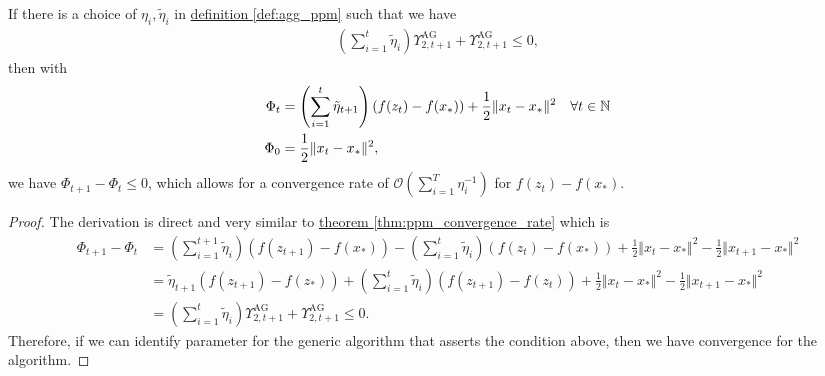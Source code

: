 \documentclass[12pt]{article}
\begin{document}
        \begin{theorem}\label{thm:generic_smooth_ag_convergence}
            If there is a choice of $\eta_i, \tilde \eta_i$ in \hyperref[def:agg_ppm]{definition \ref*{def:agg_ppm}} such that we have 
            \begin{align*}
                \left(
                    \sum_{i = 1}^{t} \tilde \eta_i
                \right)\Upsilon_{2, t + 1}^{\text{AG}} + \Upsilon_{2, t + 1}^{\text{AG}} \le 0, 
            \end{align*}
            then with 
            \begin{align*}
                \Phi_t &= \left(
                    \sum_{i = 1}^{t} \tilde\eta_{t + 1}
                \right) (f(z_t) - f(x_*)) + \frac{1}{2}\Vert x_t - x_*\Vert^2 \quad \forall t \in \mathbb N
                \\
                \Phi_0 &= \frac{1}{2}\Vert x_t - x_*\Vert^2, 
            \end{align*}
            we have $\Phi_{t + 1} - \Phi_t \le 0$, which allows for a convergence rate of $\mathcal O \left(\sum_{i = 1}^{T} \eta_i^{-1}\right)$ for $f(z_t) - f(x_*)$. 
        \end{theorem}
        \begin{proof}
            The derivation is direct and very similar to \hyperref[thm:ppm_convergence_rate]{theorem \ref*{thm:ppm_convergence_rate}} which is 
            {\footnotesize
            \begin{align*}
                \Phi_{t + 1} - \Phi_t 
                &= 
                \left(
                    \sum_{i = 1}^{t+1} \tilde\eta_{i}
                \right) (f(z_{t + 1}) - f(x_*)) 
                - 
                \left(
                    \sum_{i = 1}^{t} \tilde\eta_{i}
                \right) (f(z_{t}) - f(x_*)) 
                + \frac{1}{2}\Vert x_t - x_*\Vert^2
                - \frac{1}{2}\Vert x_{t + 1} - x_*\Vert^2
                \\
                &= 
                \tilde \eta_{t + 1} (f(z_{t + 1}) - f(z_*))
                +
                \left(
                    \sum_{i = 1}^{t} \tilde \eta_i
                \right)(f(z_{t + 1}) - f(z_t))
                + \frac{1}{2}\Vert x_t - x_*\Vert^2
                - \frac{1}{2}\Vert x_{t + 1} - x_*\Vert^2
                \\
                &= \left(
                    \sum_{i = 1}^{t} \tilde \eta_i
                \right)\Upsilon_{2, t + 1}^{\text{AG}} + \Upsilon_{2, t + 1}^{\text{AG}} \le 0. 
            \end{align*}
            }
            Therefore, if we can identify parameter for the generic algorithm that asserts the condition above, then we have convergence for the algorithm. 
        \end{proof}
\end{document}

